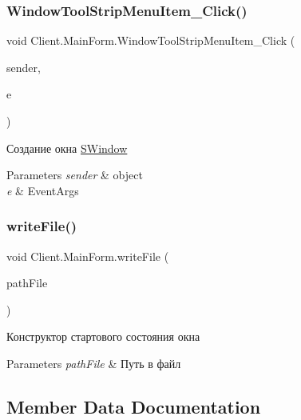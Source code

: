 \subsubsection{\texorpdfstring{Window\+Tool\+Strip\+Menu\+Item\+\_\+\+Click()}{WindowToolStripMenuItem\_Click()}}
{\footnotesize\ttfamily void Client.\+Main\+Form.\+Window\+Tool\+Strip\+Menu\+Item\+\_\+\+Click (\begin{DoxyParamCaption}\item[{object}]{sender,  }\item[{Event\+Args}]{e }\end{DoxyParamCaption})\hspace{0.3cm}{\ttfamily [inline]}}



Создание окна \hyperlink{class_client_1_1_s_window}{S\+Window} 


\begin{DoxyParams}{Parameters}
{\em sender} & object\\
\hline
{\em e} & Event\+Args\\
\hline
\end{DoxyParams}
\hypertarget{class_client_1_1_main_form_a3200a9b853b787c11bc1fa2e974e472b}{}\label{class_client_1_1_main_form_a3200a9b853b787c11bc1fa2e974e472b} 
\subsubsection{\texorpdfstring{write\+File()}{writeFile()}}
{\footnotesize\ttfamily void Client.\+Main\+Form.\+write\+File (\begin{DoxyParamCaption}\item[{string}]{path\+File }\end{DoxyParamCaption})\hspace{0.3cm}{\ttfamily [inline]}}



Конструктор стартового состояния окна 


\begin{DoxyParams}{Parameters}
{\em path\+File} & Путь в файл\\
\hline
\end{DoxyParams}


\subsection{Member Data Documentation}
\hypertarget{class_client_1_1_main_form_af46e70fe2775cc145de943ab8b152075}{}\label{class_client_1_1_main_form_af46e70fe2775cc145de943ab8b152075} 
